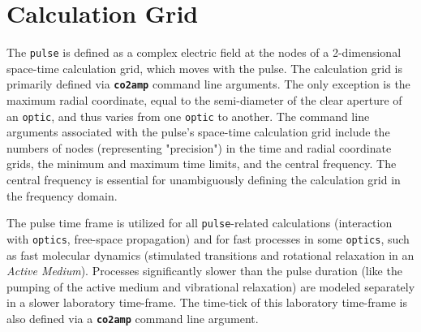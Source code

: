 \section{Calculation Grid}
The \texttt{pulse} is defined as a complex electric field at the nodes of a 2-dimensional space-time calculation grid, which moves with the pulse. The calculation grid is primarily defined via \textbf{\texttt{co2amp}} command line arguments. The only exception is the maximum radial coordinate, equal to the semi-diameter of the clear aperture of an \texttt{optic}, and thus varies from one \texttt{optic} to another. The command line arguments associated with the pulse's space-time calculation grid include the numbers of nodes (representing "precision") in the time and radial coordinate grids, the minimum and maximum time limits, and the central frequency. The central frequency is essential for unambiguously defining the calculation grid in the frequency domain.

The pulse time frame is utilized for all \texttt{pulse}-related calculations (interaction with \texttt{optics}, free-space propagation) and for fast processes in some \texttt{optics}, such as fast molecular dynamics (stimulated transitions and rotational relaxation in an \textit{Active Medium}). Processes significantly slower than the pulse duration (like the pumping of the active medium and vibrational relaxation) are modeled separately in a slower laboratory time-frame. The time-tick of this laboratory time-frame is also defined via a \textbf{\texttt{co2amp}} command line argument.

